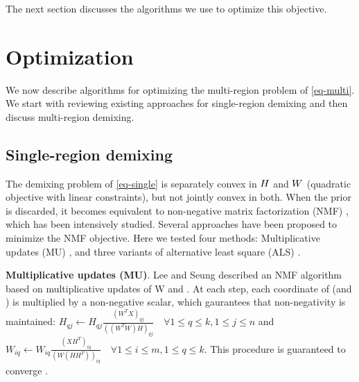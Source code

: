 The next section discusses the algorithms we use to optimize this objective.

\section{Optimization}
We now describe algorithms for optimizing the multi-region problem of \eqref{eq-multi}. We start with reviewing existing approaches for single-region demixing and then discuss multi-region demixing. 



\subsection{Single-region demixing}
The demixing problem of \eqref{eq-single} is separately convex in ${H}$ and $W$ (quadratic objective with linear constraints), but not jointly convex in both. When the prior is discarded, it becomes equivalent to non-negative matrix factorization (NMF) \cite{leenmfs}, which has been intensively studied. Several approaches have been proposed to minimize the NMF objective.
%
Here we tested four methods: Multiplicative updates (MU) \cite{leenmfs}, and three variants of alternative least square (ALS) \cite{lin2007projected,kim2008activeset,kim2011fast}. 

{\bf {Multiplicative updates (MU)}}. Lee and Seung \cite{leenmfs} described an NMF algorithm based on multiplicative updates of W and \Htext. At each step, each coordinate of \Htext (and \W) is multiplied by a non-negative scalar, which gaurantees that non-negativity is maintained: $H_{qj} \leftarrow H_{qj} \frac{(W^TX)_{qj}}{((W^TW)H)_{qj}} \quad
\forall 1\leq q \leq k, 1\leq j \leq n$ and $W_{iq} \leftarrow W_{iq} \frac{(XH^T)_{iq}}{(W(HH^T))_{iq}} \quad \forall 1\leq i \leq m, 1\leq q \leq k$.
This procedure is guaranteed to converge \cite{leenmfs,lin2007convergence}. 

